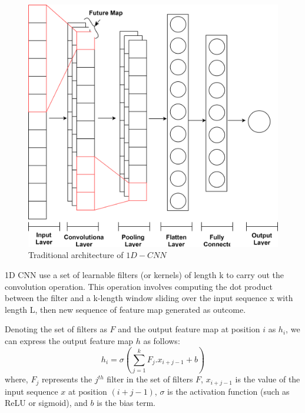 \documentclass[a4paper, fleqn]{cas-sc}
\theoremstyle{definition}
\theoremstyle{remark}
\begin{document}
\begin{figure}[h!]
  \centering
    \includegraphics[scale=.5]{cnn}
    \caption{Traditional architecture of $1D-CNN$}\label{CNN}
\end{figure}

1D CNN use a set of learnable filters (or kernels) of length k to carry out the convolution operation. This operation involves computing the dot product between the filter and a k-length window sliding over the input sequence x with length L,  then new sequence of feature map generated as outcome.

Denoting the set of filters as $F$ and the output feature map at position $i$ as $h_i$,  we can express the output feature map $h$ as follows: 
\begin{equation}\label{equ: cnn}
        h_i = \sigma \left (\sum_{j=1}^{k}F_{j}.x_{i+j-1}+b \right)
\end{equation}
where,  $F_j$ represents the $j^{th}$ filter in the set of filters $F$,  $x_{i+j-1}$ is the value of the input sequence $x$ at position $(i+j-1)$,  $\sigma$ is the activation function (such as ReLU or sigmoid),  and $b$ is the bias term.
\end{document}
